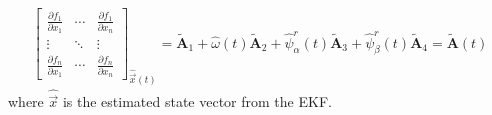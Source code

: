 \documentclass[11pt,a4paper]{scrartcl}
\numberwithin{equation}{section}
\theoremstyle{it}
\theoremstyle{definition}
\begin{document}
\begin{onehalfspace}
\begin{mybox}
\begin{equation}
\begin{aligned}
			\begin{bmatrix} \frac{\partial f_1}{\partial x_1} & \cdots & 
				\frac{\partial f_1}{\partial x_n} \\[6pt]
				\vdots & \ddots & \vdots \\[6pt]
				\frac{\partial f_n}{\partial x_1} & \cdots & \frac{\partial 
					f_n}{\partial x_n}
			\end{bmatrix}_{\hat{\vec{x}}(t)} = \tilde{\mathbf{A}}_1 + 
			\hat{\omega}(t) \tilde{\mathbf{A}}_2 + \hat{\psi}_\alpha^r(t) 
			\tilde{\mathbf{A}}_3 + \hat{\psi}_\beta^r(t) \tilde{\mathbf{A}}_4 = 
			\tilde{\mathbf{A}}(t)
		\end{aligned}
	\end{equation} 
	where $\hat{\vec{x}}$ is the estimated state vector from the EKF.
\end{mybox}


\end{onehalfspace}
\end{document}
